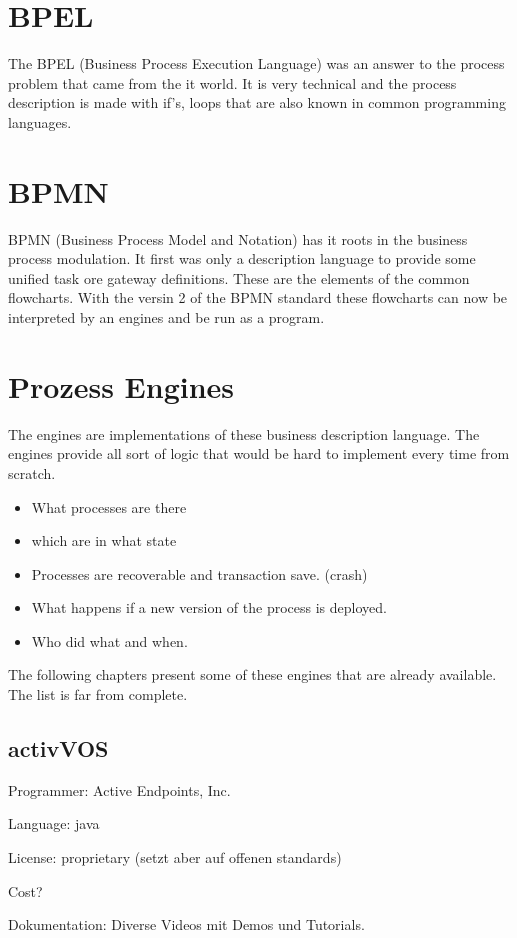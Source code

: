 \documentclass[paper=a4,twoside=false,BCOR=0mm,DIV=calc,fontsize=12pt]{scrartcl}
\begin{document}
\section{BPEL}
The BPEL (Business Process Execution Language) was an answer to the process problem that came from the it world. It is very technical and the process description is made with if's, loops that are also known in common programming languages. 

\section{BPMN}
BPMN (Business Process Model and Notation) has it roots in the business process modulation. It first was only a description language to provide some unified task ore gateway definitions. These are the elements of the common flowcharts.
With the versin 2 of the BPMN standard these flowcharts can now be interpreted by an engines and be run as a program.


\section{Prozess Engines}
The engines are implementations of these business description language. The engines provide all sort of logic that would be hard to implement every time from scratch.
\begin{itemize}
  \item What processes are there
  \item which are in what state
  \item Processes are recoverable and transaction save. (crash)
  \item What happens if a new version of the process is deployed.
  \item Who did what and when.
\end{itemize}


The following chapters present some of these engines that are already available. The list is far from complete.

\subsection{activVOS}
Programmer: Active Endpoints, Inc.

Language: java

License: proprietary (setzt aber auf offenen standards)


Cost?

Dokumentation: Diverse Videos mit Demos und Tutorials.
\end{document}
